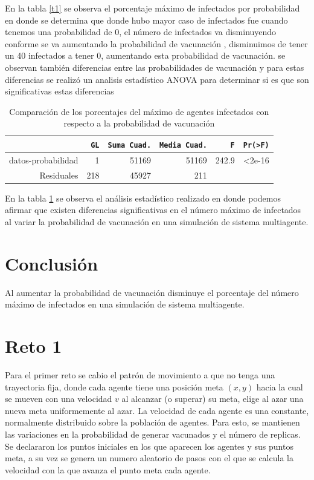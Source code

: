 \documentclass{article}
\begin{document}
 En la tabla \ref{t1} se observa el porcentaje m\'aximo de infectados por probabilidad en donde se determina que donde hubo mayor caso de infectados fue cuando tenemos una probabilidad de 0, el n\'umero de infectados va disminuyendo conforme se va aumentando la probabilidad de vacunaci\'on , disminuimos de tener un 40 infectados a tener 0, aumentando esta probabilidad de vacunaci\'on.
se observan tambi\'en diferencias entre las probabilidades de vacunaci\'on y para  estas diferencias se realiz\'o un analisis estad\'istico ANOVA \citep{clara} para determinar si es que son significativas estas diferencias

\begin{table}[H]
 \caption{Comparaci\'on de los porcentajes del m\'aximo de agentes infectados con respecto a la probabilidad de vacunaci\'on}
 \label{t1}
 \begin{center}
 \begin{tabular}{r|r|r|r|r|r}
\texttt{} & \texttt{GL} & \texttt{Suma Cuad.} &\texttt{Media Cuad.} & \texttt{F}  & \texttt{Pr(>F)} \\
\hline
datos-probabilidad & 1 & 51169 & 51169 & 242.9 & <2e-16\\ 
\hline
Residuales & 218& 45927 & 211 \\ 
\end{tabular}
\end{center}
\label{t2}
\end{table}

En la tabla \ref{t2} se observa el an\'alisis estad\'istico realizado en donde podemos afirmar que existen diferencias significativas en el n\'umero m\'aximo de infectados al variar la probabilidad de vacunaci\'on en una simulaci\'on de sistema multiagente.


\section{Conclusi\'{o}n}\label{con}
Al aumentar  la probabilidad de vacunaci\'on disminuye el porcentaje del n\'umero m\'aximo de infectados en una simulaci\'on de sistema multiagente.

\section{Reto 1}\label{ret}

Para el primer reto se cabio el patr\'on de movimiento a que no tenga una trayectoria fija, donde cada agente tiene una posici\'on meta $(x,y)$ hacia la cual se mueven con una velocidad $v$ al alcanzar (o superar) su meta, elige al azar una nueva meta uniformemente al azar. La velocidad de cada agente es una constante, normalmente distribuido sobre la poblaci\'on de agentes. 
Para esto, se mantienen las variaciones en la probabilidad de generar vacunados y el n\'umero de replicas.
Se declararon los puntos iniciales en los que aparecen los agentes y sus puntos meta, a su vez se genera un numero aleatorio de pasos con el que se calcula la velocidad con la que avanza el punto meta cada agente.
\end{document}
